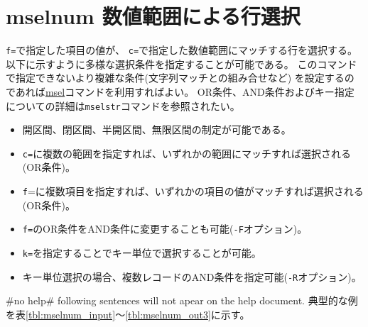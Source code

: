 
%

\section{mselnum 数値範囲による行選択\label{sect:mselnum}}
\verb|f=|で指定した項目の値が、
\verb|c=|で指定した数値範囲にマッチする行を選択する。
以下に示すように多様な選択条件を指定することが可能である。
このコマンドで指定できないより複雑な条件(文字列マッチとの組み合せなど)
を設定するのであれば\hyperref[sect:msel]{msel}コマンドを利用すればよい。
OR条件、AND条件およびキー指定についての詳細は\verb|mselstr|コマンドを参照されたい。

\begin{itemize}
\item 開区間、閉区間、半開区間、無限区間の制定が可能である。
\item \verb|c=|に複数の範囲を指定すれば、いずれかの範囲にマッチすれば選択される(OR条件)。
\item \verb|f|=に複数項目を指定すれば、いずれかの項目の値がマッチすれば選択される(OR条件)。
\item \verb|f=|のOR条件をAND条件に変更することも可能(\verb|-F|オプション)。
\item \verb|k=|を指定することでキー単位で選択することが可能。
\item キー単位選択の場合、複数レコードのAND条件を指定可能(\verb|-R|オプション)。
\end{itemize}

 #no help# following sentences will not apear on the help document. \fi
典型的な例を表\ref{tbl:mselnum_input}〜\ref{tbl:mselnum_out3}に示す。

